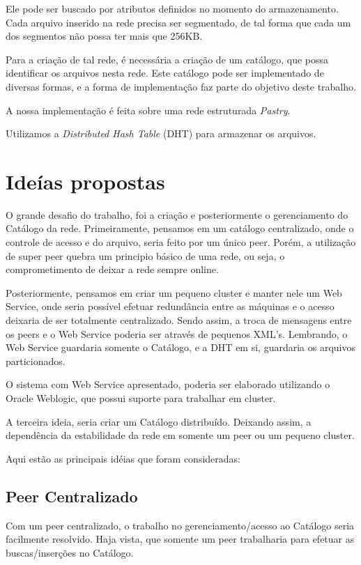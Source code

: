 \documentclass{acm_proc_article-sp}
\begin{document}
Ele pode ser buscado por atributos definidos no momento do armazenamento. Cada arquivo inserido na rede precisa ser segmentado, de tal forma que cada um dos segmentos não possa ter mais que 256KB.

Para a criação de tal rede, é necessária a criação de um catálogo, que possa identificar os arquivos nesta rede. Este catálogo pode ser implementado de diversas formas, e a forma de implementação faz parte do objetivo deste trabalho.

A nossa implementação é feita sobre uma rede estruturada \textit{Pastry}. 

Utilizamos a \textit{Distributed Hash Table} (DHT) para armazenar os arquivos.

\section{Ideías propostas}
O grande desafio do trabalho, foi a criação e posteriormente o gerenciamento do Catálogo da rede. Primeiramente, pensamos em um catálogo centralizado, onde o controle de acesso e do arquivo, seria feito por um único peer.  Porém, a utilização de super peer quebra um principio básico de uma rede, ou seja, o comprometimento de deixar a rede sempre online.

Posteriormente, pensamos em criar um pequeno cluster e manter nele um Web Service, onde seria possível efetuar redundância entre as máquinas e o acesso deixaria de ser totalmente centralizado. Sendo assim, a troca de mensagens entre os peers e o Web Service poderia ser através de pequenos XML's. Lembrando, o Web Service guardaria somente o Catálogo, e a DHT em si, guardaria os arquivos particionados.

O sistema com Web Service apresentado, poderia ser elaborado utilizando o Oracle Weblogic, que possui suporte para trabalhar em cluster.

A terceira ideia, seria criar um Catálogo distribuído. Deixando assim, a dependência da estabilidade da rede em somente um peer ou um pequeno cluster.

Aqui estão as principais idéias que foram consideradas:

\subsection{Peer Centralizado}

Com um peer centralizado, o trabalho no gerenciamento/acesso ao Catálogo seria facilmente resolvido. Haja vista, que somente um peer trabalharia para efetuar as buscas/inserções no Catálogo. 
\end{document}
